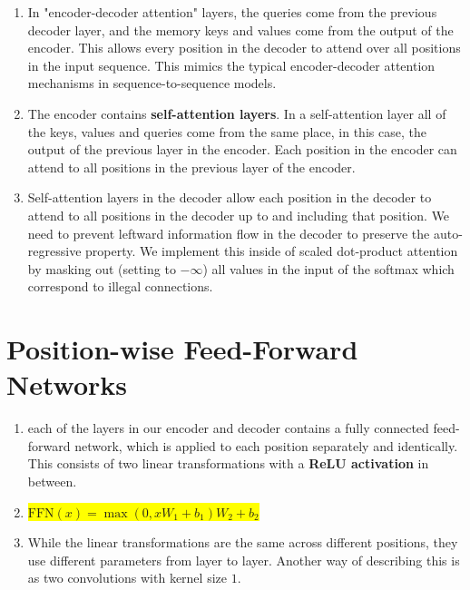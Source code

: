 \begin{enumerate}
    \item In "encoder-decoder attention" layers, the queries come from the previous decoder layer, and the memory keys and values come from the output of the encoder. 
    This allows every position in the decoder to attend over all positions in the input sequence. 
    This mimics the typical encoder-decoder attention mechanisms in sequence-to-sequence models.
    \hfill \cite{arxiv/1706.03762/Attention-Is-All-You-Need}

    \item The encoder contains \textbf{self-attention layers}. 
    In a self-attention layer all of the keys, values and queries come from the same place, in this case, the output of the previous layer in the encoder. 
    Each position in the encoder can attend to all positions in the previous layer of the encoder.
    \hfill \cite{arxiv/1706.03762/Attention-Is-All-You-Need}

    \item Self-attention layers in the decoder allow each position in the decoder to attend to all positions in the decoder up to and including that position. 
    We need to prevent leftward information flow in the decoder to preserve the auto-regressive property. 
    We implement this inside of scaled dot-product attention by masking out (setting to $-\infty$) all values in the input of the softmax which correspond to illegal connections.
    \hfill \cite{arxiv/1706.03762/Attention-Is-All-You-Need}
\end{enumerate}



\section{Position-wise Feed-Forward Networks}

\begin{enumerate}
    \item each of the layers in our encoder and decoder contains a fully connected feed-forward network, which is applied to each position separately and identically. 
    This consists of two linear transformations with a \textbf{ReLU activation} in between.
    \hfill \cite{arxiv/1706.03762/Attention-Is-All-You-Need}

    \item \colorbox{yellow}{$ \text{FFN}(x) = \max(0, xW_1 + b_1)W_2 + b_2 $}
    \hfill \cite{arxiv/1706.03762/Attention-Is-All-You-Need}

    \item While the linear transformations are the same across different positions, they use different parameters from layer to layer. 
    Another way of describing this is as two convolutions with kernel size $1$.
    \hfill \cite{arxiv/1706.03762/Attention-Is-All-You-Need}
\end{enumerate}





